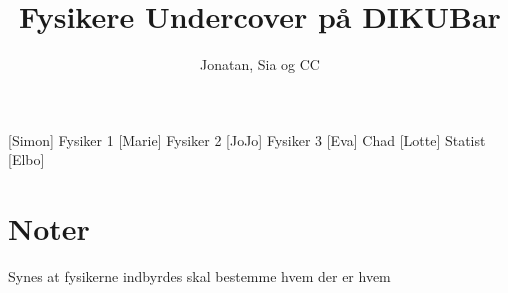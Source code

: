 \documentclass[a4paper,11pt]{article}
\title{Fysikere Undercover på DIKUBar}
\author{Jonatan, Sia og CC}
\begin{document}
\maketitle

\begin{roles}
[Simon] Fysiker 1
[Marie] Fysiker 2
[JoJo] Fysiker 3
[Eva] Chad
[Lotte] Statist
 [Elbo] 
\end{roles} 

\section*{Noter}
Synes at fysikerne indbyrdes skal bestemme hvem der er hvem

\begin{props}
\prop{}
\prop{}
\prop{}
\end{props}
\end{document}
